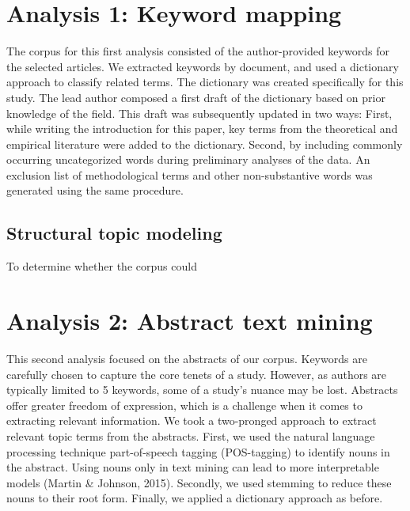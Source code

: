 \documentclass[
  english,
  man]{apa6}
\begin{document}
\hypertarget{analysis-1-keyword-mapping}{%
\section{Analysis 1: Keyword mapping}\label{analysis-1-keyword-mapping}}

The corpus for this first analysis consisted of the author-provided keywords for the selected articles.
We extracted keywords by document, and used a dictionary approach
to classify related terms.
The dictionary was created specifically for this study.
The lead author composed a first draft of the dictionary based on prior knowledge of the field.
This draft was subsequently updated in two ways:
First, while writing the introduction for this paper, key terms from the theoretical and empirical literature were added to the dictionary.
Second, by including commonly occurring uncategorized words during preliminary analyses of the data.
An exclusion list of methodological terms and other non-substantive words was generated using the same procedure.

\hypertarget{structural-topic-modeling}{%
\subsection{Structural topic modeling}\label{structural-topic-modeling}}

To determine whether the corpus could

\hypertarget{analysis-2-abstract-text-mining}{%
\section{Analysis 2: Abstract text mining}\label{analysis-2-abstract-text-mining}}

This second analysis focused on the abstracts of our corpus. Keywords are
carefully chosen to capture the core tenets of a study. However, as authors are
typically limited to 5 keywords, some of a study's nuance may be lost.
Abstracts offer greater freedom of expression, which is a challenge when it
comes to extracting relevant information. We took a two-pronged approach to
extract relevant topic terms from the abstracts. First, we used the natural
language processing technique part-of-speech tagging (POS-tagging) to identify
nouns in the abstract. Using nouns only in text mining can lead to more
interpretable models (Martin \& Johnson, 2015). Secondly, we used
stemming to reduce these nouns to their root form. Finally, we applied a
dictionary approach as before.
\end{document}
